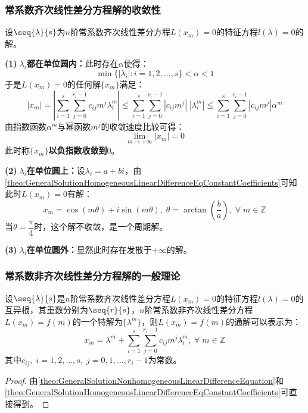 \subsubsection{常系数齐次线性差分方程解的收敛性}
\begin{derivation}
	设$\seq{\lambda}{s}$为$n$阶常系数齐次线性差分方程$L(x_m)=0$的特征方程$l(\lambda)=0$的解。\par
	\textbf{(1)$\;\lambda_i$都在单位圆内：}此时存在$\alpha$使得：
	\begin{equation*}
		\min\{|\lambda_i|:i=1,2,\dots,s\}<\alpha<1
	\end{equation*}
	于是$L(x_m)=0$的任何解$\{x_m\}$满足：
	\begin{equation*}
		|x_m|=\left|\sum_{i=1}^{s}\sum_{j=0}^{r_i-1}c_{ij}m^{j}\lambda_i^m\right|\leqslant\sum_{i=1}^{s}\sum_{j=0}^{r_i-1}|c_{ij}m^{j}|\;|\lambda_i^m|\leqslant\sum_{i=1}^{s}\sum_{j=0}^{r_i-1}|c_{ij}m^{j}|\alpha^m
	\end{equation*}
	由指数函数$\alpha^m$与幂函数$m^j$的收敛速度比较可得：
	\begin{equation*}
		\lim_{m\to+\infty}|x_m|=0
	\end{equation*}
	此时称$\{x_m\}$\textbf{以负指数收敛到$0$}。\par
	\textbf{(2)$\;\lambda_i$在单位圆上：}设$\lambda_i=a+bi$，由\cref{theo:GeneralSolutionHomogeneousLinearDifferenceEqConstantCoefficients}可知此时$L(x_m)=0$有解：
	\begin{equation*}
		x_m=\cos(m\theta)+i\sin(m\theta),\;\theta=\arctan\left(\frac{b}{a}\right),\;\forall\;m\in\mathbb{Z}^{}
	\end{equation*}
	当$\theta=\dfrac{\pi}{4}$时，这个解不收敛，是一个周期解。\par
	\textbf{(3)$\;\lambda_i$在单位圆外：}显然此时存在发散于$+\infty$的解。
\end{derivation}
\subsubsection{常系数非齐次线性差分方程解的一般理论}
\begin{theorem}\label{theo:GeneralSolutionNonhomogeneousLinearDifferenceEqConstantCoefficients}
	设$\seq{\lambda}{s}$是$n$阶常系数齐次线性差分方程$L(x_m)=0$的特征方程$l(\lambda)=0$的互异根，其重数分别为$\seq{r}{s}$，$n$阶常系数非齐次线性差分方程$L(x_m)=f(m)$的一个特解为$\{\lambda^m\}$，则$L(x_m)=f(m)$的通解可以表示为：
	\begin{equation*}
		x_m=\lambda^m+\sum_{i=1}^{s}\sum_{j=0}^{r_i-1}c_{ij}m^{j}\lambda_i^m,\;\forall\;m\in\mathbb{Z}^{}
	\end{equation*}
	其中$c_{ij},\;i=1,2,\dots,s,\;j=0,1,\dots,r_i-1$为常数。
\end{theorem}
\begin{proof}
	由\cref{theo:GeneralSolutionNonhomogeneousLinearDifferenceEquation}和\cref{theo:GeneralSolutionHomogeneousLinearDifferenceEqConstantCoefficients}可直接得到。
\end{proof}


